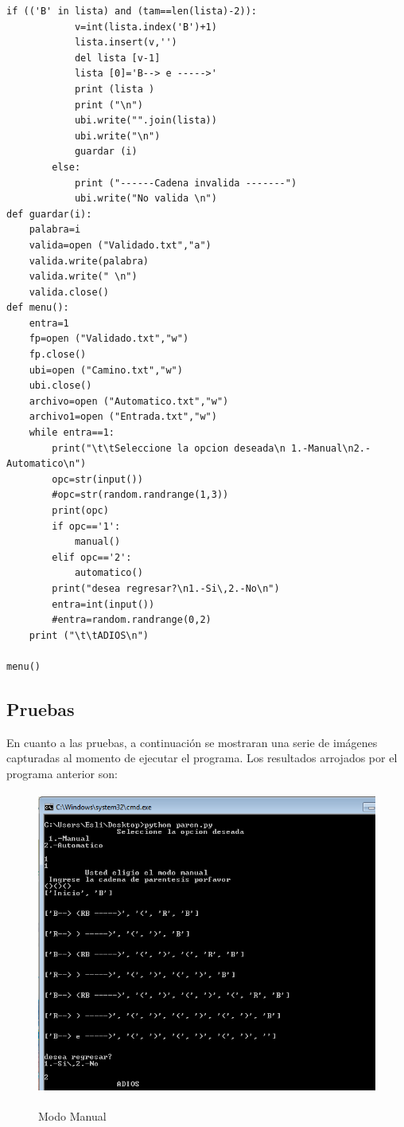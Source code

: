 \documentclass[12pt]{article}
\begin{document}
\begin{lstlisting}[frame=single]
		if (('B' in lista) and (tam==len(lista)-2)):
			v=int(lista.index('B')+1)
			lista.insert(v,'')
			del lista [v-1]
			lista [0]='B--> e ----->'
			print (lista )
			print ("\n")
			ubi.write("".join(lista))
			ubi.write("\n")
			guardar (i)
		else:
			print ("------Cadena invalida -------")
			ubi.write("No valida \n")
def guardar(i):
	palabra=i
	valida=open ("Validado.txt","a")
	valida.write(palabra)
	valida.write(" \n")
	valida.close()
def menu():
	entra=1
	fp=open ("Validado.txt","w")
	fp.close()
	ubi=open ("Camino.txt","w")
	ubi.close()
	archivo=open ("Automatico.txt","w")
	archivo1=open ("Entrada.txt","w")
	while entra==1:
		print("\t\tSeleccione la opcion deseada\n 1.-Manual\n2.-Automatico\n")
		opc=str(input())
		#opc=str(random.randrange(1,3))
		print(opc)
		if opc=='1':
			manual()
		elif opc=='2':
			automatico()
		print("desea regresar?\n1.-Si\,2.-No\n")
		entra=int(input())
		#entra=random.randrange(0,2)
	print ("\t\tADIOS\n")

menu()

\end{lstlisting}

\subsection{Pruebas}
En cuanto a las pruebas, a continuación se mostraran una serie de imágenes capturadas al momento de ejecutar el programa. Los resultados arrojados por el programa anterior son:

\begin{figure}[H]
\includegraphics[width=\textwidth, height=10cm]{manual_paren}
\label{fig:manual_afn}
\caption{Modo Manual}
\end{figure}
\end{document}
